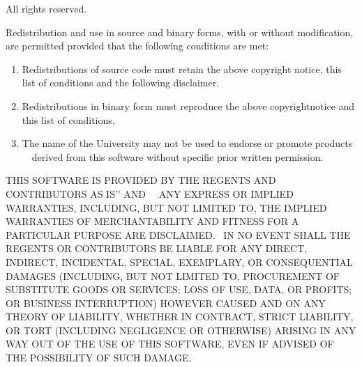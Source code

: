 \documentclass[letterpaper]{article}
\newcommand\liststyleWWviiiNumix{%
\renewcommand\theenumi{\arabic{enumi}}
\renewcommand\theenumii{\arabic{enumii}}
\renewcommand\theenumiii{\arabic{enumiii}}
\renewcommand\theenumiv{\arabic{enumiv}}
\renewcommand\labelenumi{\theenumi.}
\renewcommand\labelenumii{\theenumii.}
\renewcommand\labelenumiii{\theenumiii.}
\renewcommand\labelenumiv{\theenumiv.}
}
\begin{document}
{\mdseries\upshape\color{black}
All rights reserved.}

{\mdseries\upshape\color{black}
Redistribution and use in source and binary forms, with or without modification, are permitted provided that the following conditions are met:}

\liststyleWWviiiNumix
\begin{enumerate}
\item {\color{black}
Redistributions of source code must retain the above copyright notice, this list of conditions and the following disclaimer.}
\item {\color{black}
Redistributions in binary form must reproduce the above copyrightnotice and this list of conditions.}
\item {\color{black}
The name of the University may not be used to endorse or promote products \ \ derived from this software without specific prior written permission.}
\end{enumerate}
{\color{black}
THIS SOFTWARE IS PROVIDED BY THE REGENTS AND CONTRIBUTORS {\textasciigrave}{\textasciigrave}AS IS'{}' AND \ \ ANY EXPRESS OR IMPLIED WARRANTIES, INCLUDING, BUT NOT LIMITED TO, THE IMPLIED WARRANTIES OF MERCHANTABILITY AND FITNESS FOR A PARTICULAR PURPOSE ARE DISCLAIMED. \ IN NO EVENT SHALL THE REGENTS OR CONTRIBUTORS BE LIABLE FOR ANY DIRECT, INDIRECT, INCIDENTAL, SPECIAL, EXEMPLARY, OR CONSEQUENTIAL DAMAGES (INCLUDING, BUT NOT LIMITED TO, PROCUREMENT OF SUBSTITUTE GOODS OR SERVICES; LOSS OF USE, DATA, OR PROFITS; OR BUSINESS INTERRUPTION) HOWEVER CAUSED AND ON ANY THEORY OF LIABILITY, WHETHER IN CONTRACT, STRICT LIABILITY, OR TORT (INCLUDING NEGLIGENCE OR OTHERWISE) ARISING IN ANY WAY OUT OF THE USE OF THIS SOFTWARE, EVEN IF ADVISED OF THE POSSIBILITY OF SUCH DAMAGE.}


\bigskip
\end{document}
